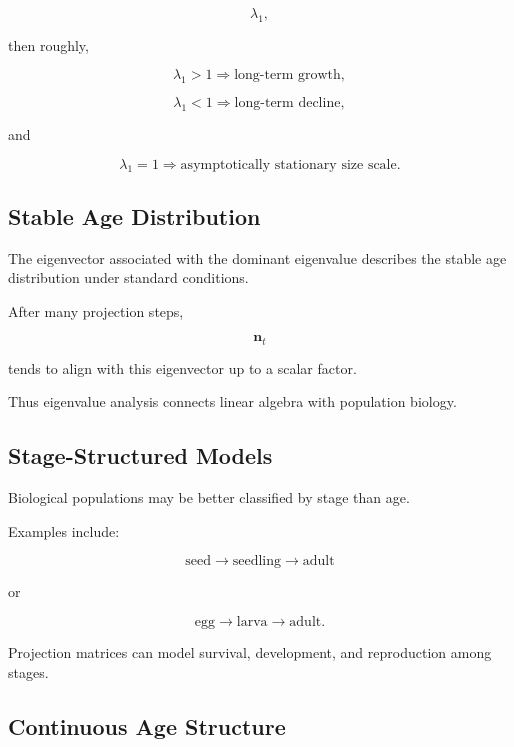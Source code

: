 \[
\lambda_1,
\]

then roughly,

\[
\boxed{
\lambda_1>1
\Rightarrow
\text{long-term growth},
}
\]

\[
\boxed{
\lambda_1<1
\Rightarrow
\text{long-term decline},
}
\]

and

\[
\boxed{
\lambda_1=1
\Rightarrow
\text{asymptotically stationary size scale}.
}
\]

\subsection{Stable Age Distribution}
\label{subsec:stable-age-distribution}

The eigenvector associated with the dominant eigenvalue describes the stable
age distribution under standard conditions.

After many projection steps,

\[
\mathbf{n}_t
\]

tends to align with this eigenvector up to a scalar factor.

Thus eigenvalue analysis connects linear algebra with population biology.

\subsection{Stage-Structured Models}
\label{subsec:stage-structured-models}

Biological populations may be better classified by stage than age.

Examples include:

\[
\boxed{
\text{seed}
\rightarrow
\text{seedling}
\rightarrow
\text{adult}
}
\]

or

\[
\boxed{
\text{egg}
\rightarrow
\text{larva}
\rightarrow
\text{adult}.
}
\]

Projection matrices can model survival, development, and reproduction among
stages.

\subsection{Continuous Age Structure}
\label{subsec:continuous-age-structure}

